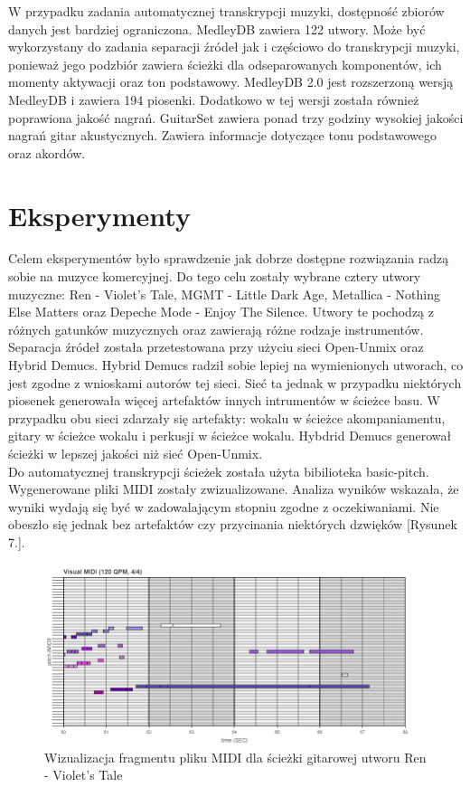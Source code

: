 \documentclass{article}
\begin{document}
W przypadku zadania automatycznej transkrypcji muzyki, dostępność zbiorów danych jest bardziej ograniczona. MedleyDB \cite{madleydb} zawiera 122 utwory. Może być wykorzystany do zadania separacji źródeł jak i częściowo do transkrypcji muzyki, ponieważ jego podzbiór zawiera ścieżki dla odseparowanych komponentów, ich momenty aktywacji oraz ton podstawowy. MedleyDB 2.0 \cite{Bittner2016MedleyDB2N} jest rozszerzoną wersją MedleyDB i zawiera 194 piosenki. Dodatkowo w tej wersji została również poprawiona jakość nagrań. GuitarSet \cite{guitarset} zawiera ponad trzy godziny wysokiej jakości nagrań gitar akustycznych. Zawiera informacje dotyczące tonu podstawowego oraz akordów.\\


\section{Eksperymenty}
Celem eksperymentów było sprawdzenie jak dobrze dostępne rozwiązania radzą sobie na muzyce komercyjnej. Do tego celu zostały wybrane cztery utwory muzyczne: Ren - Violet's Tale, MGMT - Little Dark Age, Metallica - Nothing Else Matters oraz Depeche Mode - Enjoy The Silence. Utwory te pochodzą z różnych gatunków muzycznych oraz zawierają różne rodzaje instrumentów. Separacja źródeł została przetestowana przy użyciu sieci Open-Unmix oraz Hybrid Demucs. Hybrid Demucs radził sobie lepiej na wymienionych utworach, co jest zgodne z wnioskami autorów tej sieci. Sieć ta jednak w przypadku niektórych piosenek generowała więcej artefaktów innych intrumentów w ścieżce basu. W przypadku obu sieci zdarzały się artefakty: wokalu w ścieżce akompaniamentu, gitary w ścieżce wokalu i perkusji w ścieżce wokalu. Hybdrid Demucs generował ścieżki w lepszej jakości niż sieć Open-Unmix. \\

Do automatycznej transkrypcji ścieżek została użyta bibilioteka basic-pitch. Wygenerowane pliki MIDI zostały zwizualizowane. Analiza wyników wskazała, że wyniki wydają się być w zadowalającym stopniu zgodne z oczekiwaniami. Nie obeszło się jednak bez artefaktów czy przycinania niektórych dzwięków [Rysunek 7.].\\

\begin{figure}[h!]
\centering
\includegraphics[width=0.75\linewidth]{bokeh_plot_guitar_ren.png}
\caption{\label{fig:unet}Wizualizacja fragmentu pliku MIDI dla ścieżki gitarowej utworu Ren - Violet's Tale}
\end{figure}
\end{document}
